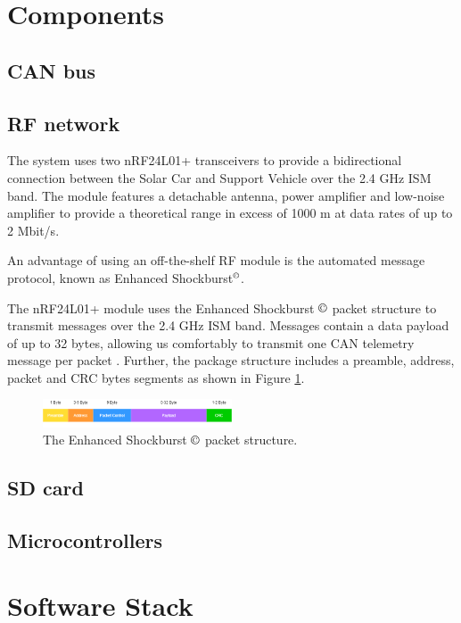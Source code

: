 \documentclass[conference]{IEEEtran}
\begin{document}
\section{Components}
\subsection{CAN bus}
\subsection{RF network} %
The system uses two nRF24L01+ transceivers to provide a bidirectional connection between the Solar Car and Support Vehicle over the 2.4 GHz ISM band. The module features a detachable antenna, power amplifier and low-noise amplifier to provide a theoretical range in excess of 1000 m at data rates of up to 2 Mbit/s.

An advantage of using an off-the-shelf RF module is the automated message protocol, known as Enhanced Shockburst$^{\copyright}$.

The nRF24L01+ module uses the Enhanced Shockburst $\copyright$ packet structure to transmit messages over the 2.4 GHz ISM band. Messages contain a data payload of up to 32 bytes, allowing us comfortably to transmit one CAN telemetry message per packet \cite{shockburst}. Further, the package structure includes a preamble, address, packet and CRC bytes segments as shown in Figure \ref{fig:shockburst}. 

\begin{figure}[h]
    \centering
    \includegraphics[width=0.5\textwidth]{documentation/images/EnhancedShockburst.png}
    \caption{The Enhanced Shockburst $\copyright$ packet structure.}
    \label{fig:shockburst}
\end{figure}

\subsection{SD card}
\subsection{Microcontrollers} %

\section{Software Stack}
\end{document}
